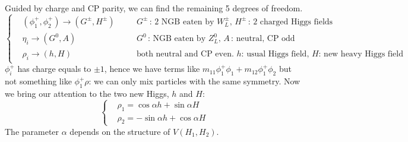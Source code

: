 \documentclass[../main.tex]{subfiles}
\begin{document}
Guided by charge and CP parity, we can find the remaining 5 degrees of freedom.
\[
\left\{
\begin{aligned}
&(\phi_1^+,\phi_2^+)\xrightarrow[]{}(G^\pm,H^\pm) \quad &&G^\pm\,\text{: 2 NGB eaten by $W_L^\pm$},\, H^\pm\,\text{: 2 charged Higgs fields}\\
&\eta_i\xrightarrow[]{}(G^0,A)\quad &&G^0\,\text{: NGB eaten by $Z^0_L$},\, A\,\text{: neutral, CP odd}\\
&\rho_i\xrightarrow[]{}(h,H) \quad &&\text{both neutral and CP even. $h$: usual Higgs field, $H$: new heavy Higgs field}
\end{aligned}
\right.
\]
$\phi_i^+$ has charge equals to $\pm1$, hence we have terms like $m_{11}\phi_1^+\phi_1+m_{12}\phi_1^+\phi_2$ but not something like $\phi_1^+\rho$: we can only mix particles with the same symmetry. Now we bring our attention to the two new Higgs, $h$ and $H$:
\[
\left\{
\begin{aligned}
&\rho_1=\cos\alpha h+\sin\alpha H\\
&\rho_2=-\sin\alpha h+\cos\alpha H
\end{aligned}
\right.
\]
The parameter $\alpha$ depends on the structure of $V(H_1,H_2)$.
\end{document}
